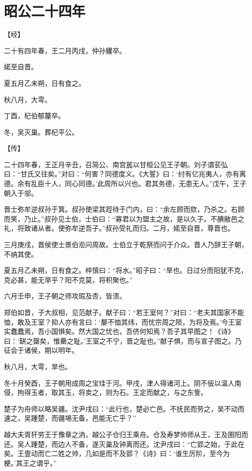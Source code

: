 \documentclass[a4paper,12pt,UTF8,twoside]{ctexbook}
\begin{document}
\section{昭公二十四年}



【经】

二十有四年春，王二月丙戌，仲孙貜卒。

婼至自晋。

夏五月乙未朔，日有食之。

秋八月，大雩。

丁酉，杞伯郁釐卒。

冬，吴灭巢。葬杞平公。

【传】

二十四年春，王正月辛丑，召简公、南宫嚚以甘桓公见王子朝。刘子谓苌弘曰：“甘氏又往矣。”对曰：“何害？同德度义。《大誓》曰：‘纣有亿兆夷人，亦有离德。余有乱臣十人，同心同德。’此周所以兴也。君其务德，无患无人。”戊午，王子朝入于邬。

晋士弥牟逆叔孙于箕。叔孙使梁其踁待于门内，曰：“余左顾而欬，乃杀之。右顾而笑，乃止。”叔孙见士伯，士伯曰：“寡君以为盟主之故，是以久子。不腆敝邑之礼，将致诸从者。使弥牟逆吾子。”叔孙受礼而归。二月，婼至自晋，尊晋也。

三月庚戌，晋侯使士景伯涖问周故。士伯立于乾祭而问于介众。晋人乃辞王子朝，不纳其使。

夏五月乙未朔，日有食之。梓慎曰：“将水。”昭子曰：“旱也。日过分而阳犹不克，克必甚，能无旱乎？阳不克莫，将积聚也。”

六月壬申，王子朝之师攻瑕及杏，皆溃。

郑伯如晋，子大叔相，见范献子。献子曰：“若王室何？”对曰：“老夫其国家不能恤，敢及王室？抑人亦有言曰：‘嫠不恤其纬，而忧宗周之陨，为将及焉。’今王室实蠢蠢焉，吾小国惧矣。然大国之忧也，吾侪何知焉？吾子其早图之！《诗》曰：‘缾之罄矣，惟罍之耻。’王室之不宁，晋之耻也。”献子惧，而与宣子图之。乃征会于诸侯，期以明年。

秋八月，大雩，旱也。

冬十月癸酉，王子朝用成周之宝珪于河。甲戌，津人得诸河上。阴不佞以温人南侵，拘得玉者，取其玉，将卖之，则为石。王定而献之，与之东訾。

楚子为舟师以略吴疆。沈尹戌曰：“此行也，楚必亡邑。不抚民而劳之，吴不动而速之，吴踵楚，而疆埸无备，邑能无亡乎？”

越大夫胥犴劳王于豫章之汭，越公子仓归王乘舟。仓及寿梦帅师从王，王及圉阳而还。吴人踵楚，而边人不备，遂灭巢及钟离而还。沈尹戌曰：“亡郢之始，于此在矣。王壹动而亡二姓之帅，几如是而不及郢？《诗》曰：‘谁生厉阶，至今为梗。’其王之谓乎。”
\end{document}
